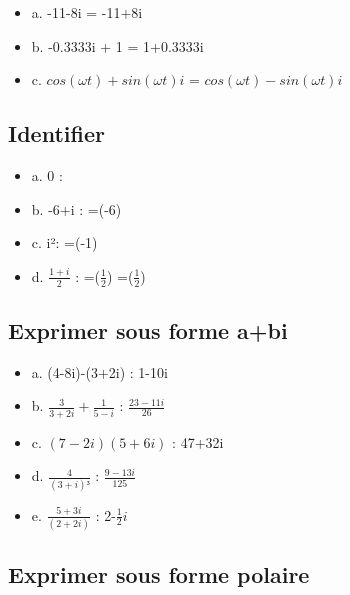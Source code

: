\begin{itemize}
\item {a. -11-8i = -11+8i}
\item {b. -0.3333i + 1 = 1+0.3333i}
\item {c. $cos(\omega t) + sin(\omega t)i$ = $cos(\omega t) - sin(\omega t)i$ }
\end{itemize}


\vspace{3mm} %
\subsection{Identifier \R $  $ \I}
\vspace{3mm} %

\begin{itemize}
\item {a. 0 :   }
\item {b. -6+i : \R=(-6) }
\item {c. i²: \R=(-1) }
\item {d. $\frac{1+i}{2}$ : \R=($\frac{1}{2}$) \I=($\frac{1}{2}$)}
\end{itemize}


\vspace{3mm} %
\subsection{Exprimer sous forme a+bi}
\vspace{3mm} %

\begin{itemize}
\item {a. (4-8i)-(3+2i) : 1-10i}
\item {b. $\frac{3}{3+2i} + \frac{1}{5-i}$ : $\frac{23-11i}{26}$}
\item {c. $(7-2i)(5+6i)$ : 47+32i}
\item {d. $\frac{4}{(3+i)³}$ : $\frac{9-13i}{125}$}
\item {e. $\frac{5+3i}{(2+2i)}$ : 2-$\frac{1}{2}i$}
\end{itemize}


\vspace{3mm} %
\subsection{Exprimer sous forme polaire}
\vspace{3mm} %

